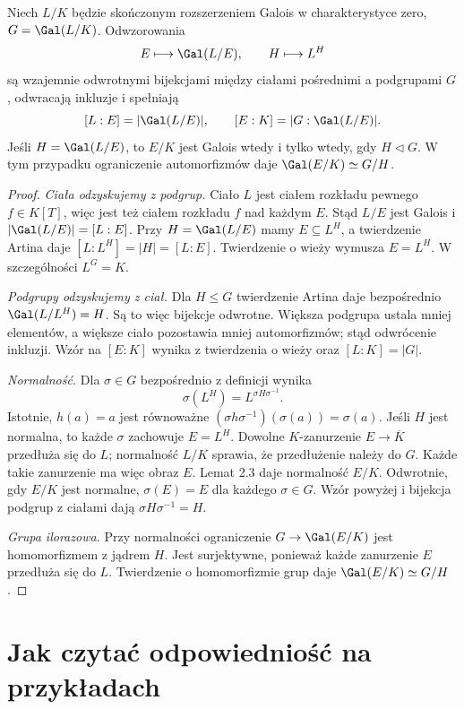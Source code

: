 \begin{twierdzenie}
Niech $L/K$ będzie skończonym rozszerzeniem Galois w charakterystyce zero, $G=\Gal(L/K)$. Odwzorowania
\[
E\longmapsto\Gal(L/E),\qquad H\longmapsto L^H
\]
są wzajemnie odwrotnymi bijekcjami między ciałami pośrednimi a podgrupami $G$, odwracają inkluzje i spełniają
\[
[L:E]=|\Gal(L/E)|,\qquad [E:K]=|G:\Gal(L/E)|.
\]
Jeśli $H=\Gal(L/E)$, to $E/K$ jest Galois wtedy i tylko wtedy, gdy $H\triangleleft G$. W tym przypadku ograniczenie automorfizmów daje $\Gal(E/K)\simeq G/H$.
\end{twierdzenie}
\begin{proof}
\emph{Ciała odzyskujemy z podgrup.} Ciało $L$ jest ciałem rozkładu pewnego $f\in K[T]$, więc jest też ciałem rozkładu $f$ nad każdym $E$. Stąd $L/E$ jest Galois i $|\Gal(L/E)|=[L:E]$. Przy $H=\Gal(L/E)$ mamy $E\subseteq L^H$, a twierdzenie Artina daje $[L:L^H]=|H|=[L:E]$. Twierdzenie o wieży wymusza $E=L^H$. W szczególności $L^G=K$.

\emph{Podgrupy odzyskujemy z ciał.} Dla $H\le G$ twierdzenie Artina daje bezpośrednio $\Gal(L/L^H)=H$. Są to więc bijekcje odwrotne. Większa podgrupa ustala mniej elementów, a większe ciało pozostawia mniej automorfizmów; stąd odwrócenie inkluzji. Wzór na $[E:K]$ wynika z twierdzenia o wieży oraz $[L:K]=|G|$.

\emph{Normalność.} Dla $\sigma\in G$ bezpośrednio z definicji wynika
\[
\sigma(L^H)=L^{\sigma H\sigma^{-1}}.
\]
Istotnie, $h(a)=a$ jest równoważne $(\sigma h\sigma^{-1})(\sigma(a))=\sigma(a)$. Jeśli $H$ jest normalna, to każde $\sigma$ zachowuje $E=L^H$. Dowolne $K$-zanurzenie $E\to\overline K$ przedłuża się do $L$; normalność $L/K$ sprawia, że przedłużenie należy do $G$. Każde takie zanurzenie ma więc obraz $E$. Lemat 2.3 daje normalność $E/K$. Odwrotnie, gdy $E/K$ jest normalne, $\sigma(E)=E$ dla każdego $\sigma\in G$. Wzór powyżej i bijekcja podgrup z ciałami dają $\sigma H\sigma^{-1}=H$.

\emph{Grupa ilorazowa.} Przy normalności ograniczenie $G\to\Gal(E/K)$ jest homomorfizmem z jądrem $H$. Jest surjektywne, ponieważ każde zanurzenie $E$ przedłuża się do $L$. Twierdzenie o homomorfizmie grup daje $\Gal(E/K)\simeq G/H$.
\end{proof}

\section{Jak czytać odpowiedniość na przykładach}

